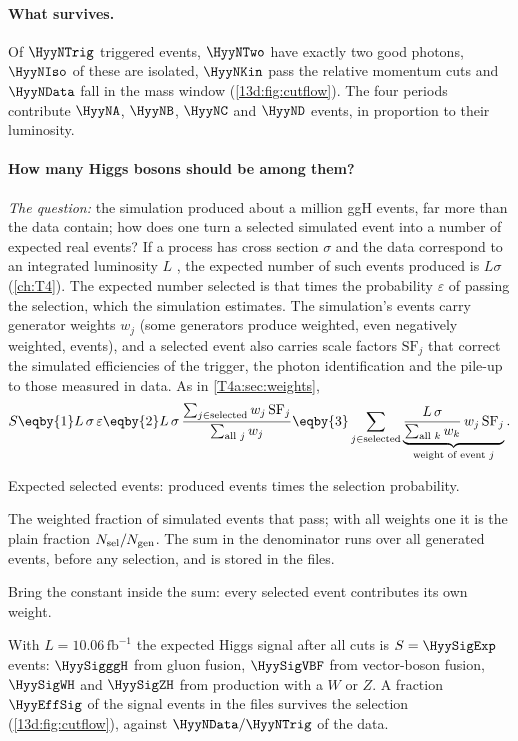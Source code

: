 \paragraph{What survives.}
Of $\HyyNTrig$ triggered events, $\HyyNTwo$ have exactly two good photons, $\HyyNIso$ of
these are isolated, $\HyyNKin$ pass the relative momentum cuts and $\HyyNData$ fall in the
mass window (\cref{13d:fig:cutflow}). The four periods contribute $\HyyNA$, $\HyyNB$,
$\HyyNC$ and $\HyyND$ events, in proportion to their luminosity.

\paragraph{How many Higgs bosons should be among them?}
\emph{The question:} the simulation produced about a million ggH events, far more than
the data contain; how does one turn a selected simulated event into a number of expected
real events? If a process has cross section $\sigma$  and the data correspond to an integrated luminosity $L$ , the expected number of such events produced is
$L\sigma$ (\cref{ch:T4}). The expected number selected is that times the probability
$\varepsilon$ of passing the selection, which the simulation estimates. The simulation's
events carry generator weights $w_j$ (some generators produce weighted, even negatively
weighted, events), and a selected event also carries scale factors $\mathrm{SF}_j$ that
correct the simulated efficiencies of the trigger, the photon identification and the
pile-up to those measured in data. As in \cref{T4a:sec:weights},
\begin{equation}
  S
  \eqby{1} L\,\sigma\,\varepsilon
  \eqby{2} L\,\sigma\,\frac{\sum_{j\in\text{selected}}w_j\,\mathrm{SF}_j}{\sum_{\text{all }j}w_j}
  \eqby{3} \sum_{j\in\text{selected}}\underbrace{\frac{L\,\sigma}{\sum_{\text{all }k}w_k}\,w_j\,\mathrm{SF}_j}_{\text{weight of event }j} .
  \label{13d:eq:mcweight}
\end{equation}
\begin{explain}
  \item Expected selected events: produced events times the selection probability.
  \item The weighted fraction of simulated events that pass; with all weights one it is
        the plain fraction $N_{\rm sel}/N_{\rm gen}$. The sum in the denominator runs over
        all generated events, before any selection, and is stored in the files.
  \item Bring the constant inside the sum: every selected event contributes its own weight.
\end{explain}
With $L=10.06\,\mathrm{fb}^{-1}$ the expected Higgs signal after all cuts is
$S=\HyySigExp$ events: $\HyySigggH$ from gluon fusion, $\HyySigVBF$ from vector-boson fusion,
$\HyySigWH$ and $\HyySigZH$ from production with a $W$ or $Z$. A fraction $\HyyEffSig$ of the
signal events in the files survives the selection (\cref{13d:fig:cutflow}), against
$\HyyNData/\HyyNTrig$ of the data.


